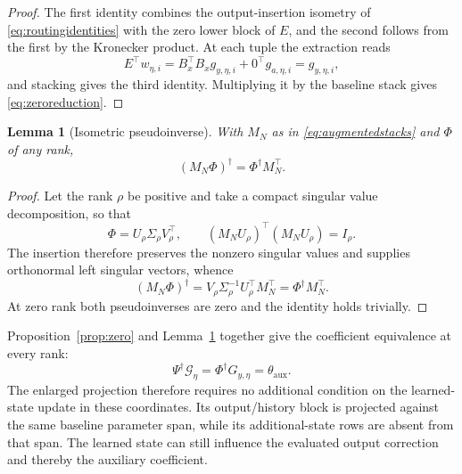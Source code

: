 \documentclass[11pt,a4paper]{article}
\newtheorem{lemma}{Lemma}
\theoremstyle{remark}
\begin{document}
\begin{proof}
The first identity combines the output-insertion isometry of \eqref{eq:routingidentities} with the
zero lower block of \(E\), and the second follows from the first by the Kronecker product. At each
tuple the extraction reads
\begin{equation*}
E^\top w_{\eta,i}=B_x^\top B_xg_{y,\eta,i}+0^\top g_{a,\eta,i}=g_{y,\eta,i},
\end{equation*}
and stacking gives the third identity. Multiplying it by the baseline stack gives
\eqref{eq:zeroreduction}.
\end{proof}

\begin{lemma}[Isometric pseudoinverse]\label{lem:isometry}
With \(M_N\) as in \eqref{eq:augmentedstacks} and \(\Phi\) of any rank,
\begin{equation}\label{eq:isometricinverse}
(M_N\Phi)^\dagger=\Phi^\dagger M_N^\top.
\end{equation}
\end{lemma}

\begin{proof}
Let the rank \(\rho\) be positive and take a compact singular value decomposition, so that
\begin{equation*}
\Phi=U_\rho\Sigma_\rho V_\rho^\top,\qquad
(M_NU_\rho)^\top(M_NU_\rho)=I_\rho.
\end{equation*}
The insertion therefore preserves the nonzero singular values and supplies orthonormal left
singular vectors, whence
\begin{equation*}
(M_N\Phi)^\dagger=V_\rho\Sigma_\rho^{-1}U_\rho^\top M_N^\top=\Phi^\dagger M_N^\top.
\end{equation*}
At zero rank both pseudoinverses are zero and the identity holds trivially.
\end{proof}

Proposition~\ref{prop:zero} and Lemma~\ref{lem:isometry} together give the coefficient equivalence
at every rank:
\begin{equation}\label{eq:coefficientidentity}
\boxed{\Psi^\dagger\mathcal G_\eta=\Phi^\dagger G_{y,\eta}=\theta_{\mathrm{aux}}.}
\end{equation}
The enlarged projection therefore requires no additional condition on the learned-state update
in these coordinates. Its output/history block is projected against the same baseline parameter
span, while its additional-state rows are absent from that span. The learned state can still
influence the evaluated output correction and thereby the auxiliary coefficient.
\end{document}
